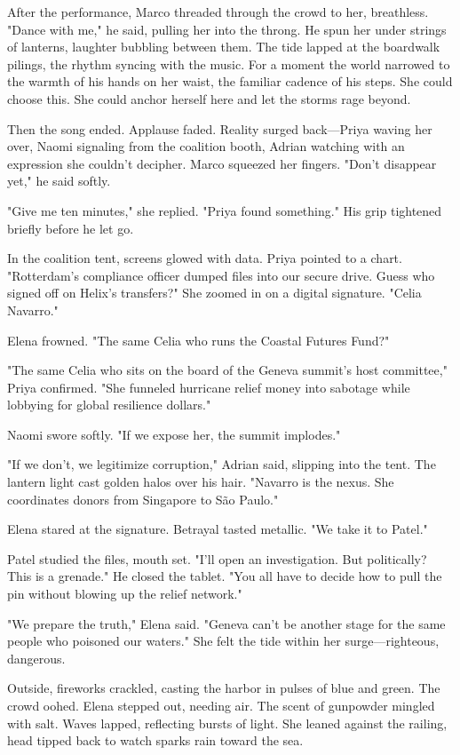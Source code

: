 After the performance, Marco threaded through the crowd to her, breathless. "Dance with me," he said, pulling her into the throng. He spun her under strings of lanterns, laughter bubbling between them. The tide lapped at the boardwalk pilings, the rhythm syncing with the music. For a moment the world narrowed to the warmth of his hands on her waist, the familiar cadence of his steps. She could choose this. She could anchor herself here and let the storms rage beyond.

Then the song ended. Applause faded. Reality surged back—Priya waving her over, Naomi signaling from the coalition booth, Adrian watching with an expression she couldn't decipher. Marco squeezed her fingers. "Don't disappear yet," he said softly.

"Give me ten minutes," she replied. "Priya found something." His grip tightened briefly before he let go.

In the coalition tent, screens glowed with data. Priya pointed to a chart. "Rotterdam's compliance officer dumped files into our secure drive. Guess who signed off on Helix's transfers?" She zoomed in on a digital signature. "Celia Navarro."

Elena frowned. "The same Celia who runs the Coastal Futures Fund?"

"The same Celia who sits on the board of the Geneva summit's host committee," Priya confirmed. "She funneled hurricane relief money into sabotage while lobbying for global resilience dollars."

Naomi swore softly. "If we expose her, the summit implodes."

"If we don't, we legitimize corruption," Adrian said, slipping into the tent. The lantern light cast golden halos over his hair. "Navarro is the nexus. She coordinates donors from Singapore to São Paulo."

Elena stared at the signature. Betrayal tasted metallic. "We take it to Patel."

Patel studied the files, mouth set. "I'll open an investigation. But politically? This is a grenade." He closed the tablet. "You all have to decide how to pull the pin without blowing up the relief network."

"We prepare the truth," Elena said. "Geneva can't be another stage for the same people who poisoned our waters." She felt the tide within her surge—righteous, dangerous.

Outside, fireworks crackled, casting the harbor in pulses of blue and green. The crowd oohed. Elena stepped out, needing air. The scent of gunpowder mingled with salt. Waves lapped, reflecting bursts of light. She leaned against the railing, head tipped back to watch sparks rain toward the sea.

